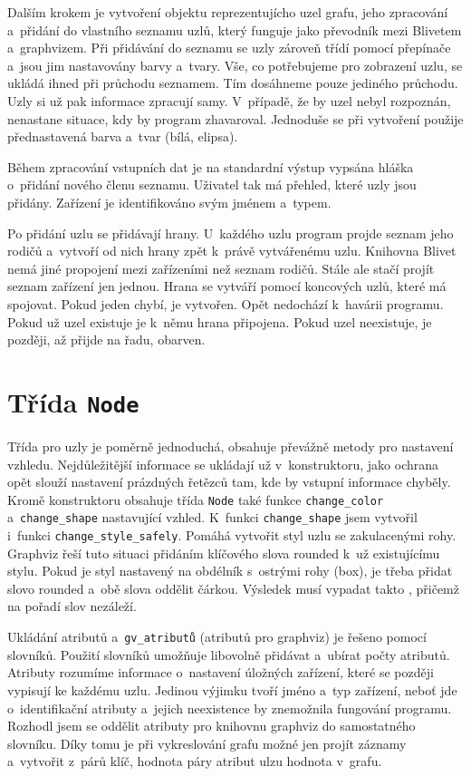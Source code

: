 \documentclass[color,table,oneside,nolot,nolof]{fithesis}
\begin{document}
	Dalším krokem je vytvoření objektu reprezentujícho uzel grafu, jeho zpracování a~přidání do vlastního seznamu uzlů, který funguje jako převodník mezi Blivetem a~graphvizem. Při
	přidávání do seznamu se uzly zároveň třídí pomocí přepínače a~jsou jim nastavovány barvy a~tvary. Vše, co potřebujeme pro zobrazení uzlu, se ukládá ihned při průchodu seznamem. 
	Tím dosáhneme pouze jediného průchodu. Uzly si už pak informace zpracují samy. V~případě, že by uzel nebyl rozpoznán, nenastane situace, kdy by program 
	zhavaroval. Jednoduše se při vytvoření použije přednastavená barva a~tvar (bílá, elipsa).

	Během zpracování vstupních dat je na
	standardní výstup vypsána hláška o~přidání nového členu seznamu. Uživatel tak má přehled, které uzly jsou přidány. Zařízení je identifikováno svým jménem a~typem.

	Po přidání uzlu se přidávají hrany. U~každého uzlu program projde seznam jeho rodičů a~vytvoří od nich hrany zpět k~právě vytvářenému uzlu. 
	Knihovna Blivet nemá jiné propojení mezi zařízeními než seznam rodičů. Stále ale stačí projít seznam zařízení jen jednou. Hrana se vytváří pomocí koncových uzlů, které má spojovat.
	Pokud jeden chybí, je vytvořen. Opět nedochází k~havárii programu. Pokud už uzel existuje je k~němu hrana připojena. Pokud uzel neexistuje, je později, až přijde na řadu, obarven.

\section{Třída \texttt{Node}}
	Třída pro uzly je poměrně jednoduchá, obsahuje převážně metody pro nastavení vzhledu. Nejdůležitější informace se ukládají už v~konstruktoru, jako ochrana opět slouží nastavení
	prázdných řetězců tam, kde by vstupní informace chyběly. Kromě konstruktoru obsahuje třída \texttt{Node} také funkce \texttt{change\_color} a~\texttt{change\_shape} nastavující vzhled. K~funkci 
	\texttt{change\_shape} 
	jsem vytvořil i~funkci \texttt{change\_style\_safely}. Pomáhá vytvořit styl uzlu se zakulacenými rohy. Graphviz řeší tuto situaci přidáním klíčového slova rounded k~už 
	existujícímu stylu. Pokud je styl nastavený na obdélník s~ostrými rohy (box), je třeba přidat slovo rounded a~obě slova oddělit čárkou. Výsledek musí vypadat takto ,
	přičemž na pořadí slov nezáleží.

	Ukládání atributů a~\texttt{gv\_atributů} (atributů pro graphviz) je řešeno pomocí slovníků. Použití slovníků umožňuje libovolně přidávat a~ubírat počty atributů. 
	Atributy rozumíme informace o~nastavení úložných zařízení, které se později vypisují ke každému uzlu. Jedinou výjimku tvoří jméno a~typ zařízení, neboť jde
	o~identifikační atributy a~jejich neexistence by znemožnila fungování programu. Rozhodl jsem se oddělit atributy pro knihovnu graphviz do samostatného slovníku. Díky tomu je při
	vykreslování grafu možné jen projít záznamy a~vytvořit z~párů klíč, hodnota páry atribut ulzu hodnota v~grafu. 
\end{document}
